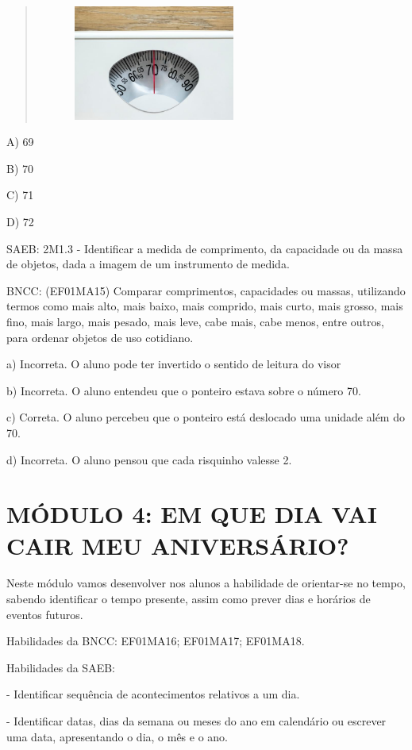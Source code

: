 \begin{quote}
\includegraphics[width=3.03770in,height=1.48580in]{media/image33.jpg}
\end{quote}

A) 69

B) 70

C) 71

D) 72

SAEB: 2M1.3 - Identificar a medida de comprimento, da capacidade ou da
massa de objetos, dada a imagem de um instrumento de medida.

BNCC: (EF01MA15) Comparar comprimentos, capacidades ou massas,
utilizando termos como mais alto, mais baixo, mais comprido, mais curto,
mais grosso, mais fino, mais largo, mais pesado, mais leve, cabe mais,
cabe menos, entre outros, para ordenar objetos de uso cotidiano.

a) Incorreta. O aluno pode ter invertido o sentido de leitura do visor

b) Incorreta. O aluno entendeu que o ponteiro estava sobre o número 70.

c) Correta. O aluno percebeu que o ponteiro está deslocado uma unidade
além do 70.

d) Incorreta. O aluno pensou que cada risquinho valesse 2.

\section{MÓDULO 4: EM QUE DIA VAI CAIR MEU ANIVERSÁRIO?
}\label{muxf3dulo-4-em-que-dia-vai-cair-meu-aniversuxe1rio}

Neste módulo vamos desenvolver nos alunos a habilidade de orientar-se no
tempo, sabendo identificar o tempo presente, assim como prever dias e
horários de eventos futuros.

Habilidades da BNCC: EF01MA16; EF01MA17; EF01MA18.

Habilidades da SAEB:

- Identificar sequência de acontecimentos relativos a um dia.

- Identificar datas, dias da semana ou meses do ano em calendário ou
escrever uma data, apresentando o dia, o mês e o ano.

